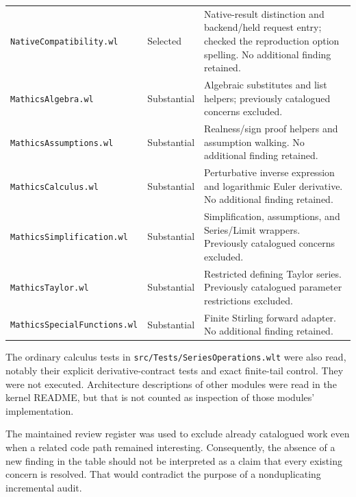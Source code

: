 \documentclass[11pt,a4paper]{article}
\newcommand{\file}[1]{\nolinkurl{#1}}
\begin{document}
\begin{longtable}{@{}L{65mm}L{20mm}L{\dimexpr\textwidth-85mm-4\tabcolsep\relax}@{}}
\file{NativeCompatibility.wl} & Selected & Native-result distinction and backend/held request entry; checked the reproduction option spelling. No additional finding retained.\\
\file{MathicsAlgebra.wl} & Substantial & Algebraic substitutes and list helpers; previously catalogued concerns excluded.\\
\file{MathicsAssumptions.wl} & Substantial & Realness/sign proof helpers and assumption walking. No additional finding retained.\\
\file{MathicsCalculus.wl} & Substantial & Perturbative inverse expression and logarithmic Euler derivative. No additional finding retained.\\
\file{MathicsSimplification.wl} & Substantial & Simplification, assumptions, and Series/Limit wrappers. Previously catalogued concerns excluded.\\
\file{MathicsTaylor.wl} & Substantial & Restricted defining Taylor series. Previously catalogued parameter restrictions excluded.\\
\file{MathicsSpecialFunctions.wl} & Substantial & Finite Stirling forward adapter. No additional finding retained.\\
\bottomrule
\end{longtable}

The ordinary calculus tests in \file{src/Tests/SeriesOperations.wlt} were also
read, notably their explicit derivative-contract tests and exact finite-tail
control. They were not executed. Architecture descriptions of other modules
were read in the kernel README, but that is not counted as inspection of those
modules' implementation.\cite{optests,layout}

The maintained review register was used to exclude already catalogued work even
when a related code path remained interesting. Consequently, the absence of a
new finding in the table should not be interpreted as a claim that every
existing concern is resolved. That would contradict the purpose of a
nonduplicating incremental audit.
\end{document}
